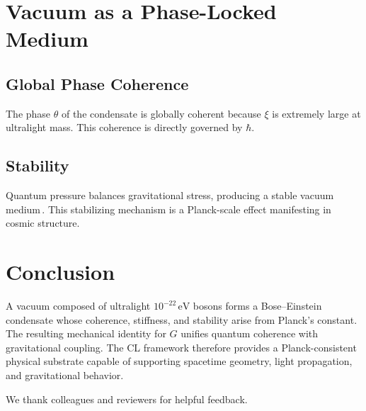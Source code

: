 \documentclass[aps,prd,twocolumn,amsmath,amssymb,longbibliography,nofootinbib]{revtex4-2}
\begin{document}
\section{Vacuum as a Phase-Locked Medium}
\subsection{Global Phase Coherence}
The phase \(\theta\) of the condensate is globally coherent because \(\xi\) is extremely large at ultralight mass. This coherence is directly governed by \(\hbar\).

\subsection{Stability}
Quantum pressure balances gravitational stress, producing a stable vacuum medium\,\cite{Hui2017ULDM}. This stabilizing mechanism is a Planck-scale effect manifesting in cosmic structure.

\section{Conclusion}
A vacuum composed of ultralight \(10^{-22}\,\mathrm{eV}\) bosons forms a Bose--Einstein condensate whose coherence, stiffness, and stability arise from Planck's constant. The resulting mechanical identity for \(G\) unifies quantum coherence with gravitational coupling. The CL framework therefore provides a Planck-consistent physical substrate capable of supporting spacetime geometry, light propagation, and gravitational behavior.

\begin{acknowledgments}
We thank colleagues and reviewers for helpful feedback.
\end{acknowledgments}



\end{document}
